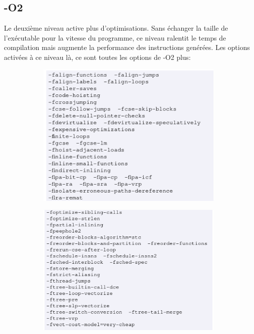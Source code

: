 \documentclass[11pt]{article} %
\begin{document}
\begin{figure}[h!]
\begin{subfigure}[h!]{0.49\textwidth}
    \end{subfigure}
\end{figure}

\subsection*{-O2}

Le deuxième niveau active plus d'optimisations. Sans échanger la taille de l'exécutable
pour la vitesse du programme, ce niveau ralentit le temps de compilation mais augmente la performance
des instructions genérées. Les options activées à ce niveau là, ce sont toutes les options de -O2 plus:

\begin{figure}[h!]
    \centering
    \begin{subfigure}[h!]{0.49\textwidth}
        \includegraphics[height=.8\linewidth]{./media/O2top}
    \end{subfigure}
    \begin{subfigure}[h!]{0.49\textwidth}
        \includegraphics[height=.8\linewidth]{./media/O2bot}
    \end{subfigure}
\end{figure}
\end{document}
